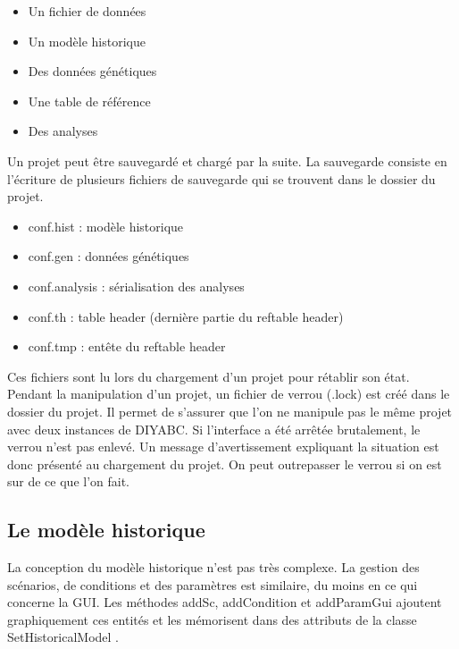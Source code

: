 \documentclass[12pt,a4paper]{article}
\begin{document}
        \begin{itemize}
            \item Un fichier de données
            \item Un modèle historique
            \item Des données génétiques
            \item Une table de référence
            \item Des analyses\\
        \end{itemize}

        Un projet peut être sauvegardé et chargé par la suite. La sauvegarde
        consiste en l'écriture de plusieurs fichiers de sauvegarde qui se
        trouvent dans le dossier du projet.\\

        \begin{itemize}
            \item conf.hist : modèle historique
            \item conf.gen : données génétiques
            \item conf.analysis : sérialisation des analyses
            \item conf.th : table header (dernière partie du reftable header)
            \item conf.tmp : entête du reftable header\\
        \end{itemize}

        Ces fichiers sont lu lors du chargement d'un projet pour rétablir son
        état. Pendant la manipulation d'un projet, un fichier de verrou (.lock)
        est créé dans le dossier du projet. Il permet de s'assurer que l'on ne
        manipule pas le même projet avec deux instances de DIYABC. Si
        l'interface a été arrêtée brutalement, le verrou n'est pas enlevé. Un
        message d'avertissement expliquant la situation est donc présenté au
        chargement du projet. On peut outrepasser le verrou si on est sur de ce
        que l'on fait.

    \subsection{Le modèle historique}
        La conception du modèle historique n'est pas très complexe. La gestion
        des scénarios, de conditions et des paramètres est similaire, du moins
        en ce qui concerne la GUI. Les méthodes addSc, addCondition et
        addParamGui ajoutent graphiquement ces entités et les mémorisent dans
        des attributs de la classe SetHistoricalModel .
\end{document}
